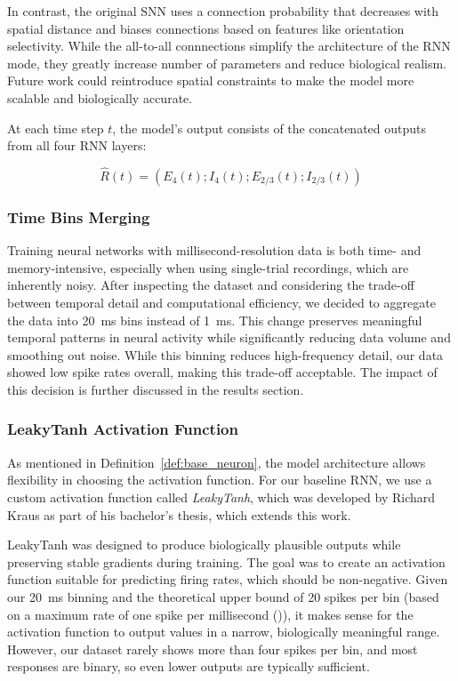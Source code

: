 In contrast, the original SNN uses a connection probability that decreases with spatial distance and biases connections based on features like orientation selectivity. While the all-to-all connnections simplify the architecture of the RNN mode, they greatly increase number of parameters and reduce biological realism. Future work could reintroduce spatial constraints to make the model more scalable and biologically accurate.

At each time step $t$, the model's output consists of the concatenated outputs from all four RNN layers:

$$\hat{R}(t) = (E_4(t); I_4(t); E_{2/3}(t); I_{2/3}(t))$$

\subsubsection{Time Bins Merging}
\label{subsubsec:time_bins_merging}

Training neural networks with millisecond-resolution data is both time- and memory-intensive, especially when using single-trial recordings, which are inherently noisy. After inspecting the dataset and considering the trade-off between temporal detail and computational efficiency, we decided to aggregate the data into 20~ms bins instead of 1~ms. This change preserves meaningful temporal patterns in neural activity while significantly reducing data volume and smoothing out noise. While this binning reduces high-frequency detail, our data showed low spike rates overall, making this trade-off acceptable. The impact of this decision is further discussed in the results section.

\subsubsection{LeakyTanh Activation Function}
\label{subsubsec:leakytanh}

As mentioned in Definition~\ref{def:base_neuron}, the model architecture allows flexibility in choosing the activation function. For our baseline RNN, we use a custom activation function called \emph{LeakyTanh}, which was developed by Richard Kraus as part of his bachelor's thesis, which extends this work.

LeakyTanh was designed to produce biologically plausible outputs while preserving stable gradients during training. The goal was to create an activation function suitable for predicting firing rates, which should be non-negative. Given our 20~ms binning and the theoretical upper bound of 20 spikes per bin (based on a maximum rate of one spike per millisecond (\citet{dayan2005theoretical})), it makes sense for the activation function to output values in a narrow, biologically meaningful range. However, our dataset rarely shows more than four spikes per bin, and most responses are binary, so even lower outputs are typically sufficient.

